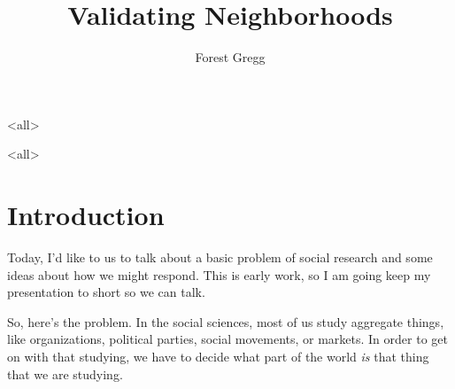 
\usepackage[english]{babel}
\usepackage{tikz}
\usepackage{xmpmulti}
\newcommand{\fadeitem}[2]{\item[]\uncover<#1>{#2}}
\title{Validating Neighborhoods}
\author{Forest Gregg}

\mode*

\mode<all>{
}

\mode<all>{
\blackout{}
}  


\section{Introduction}
Today, I'd like to us to talk about a basic problem of social
research and some ideas about how we might respond. This is early
work, so I am going keep my presentation to short so we can talk.

So, here's the problem. In the social sciences, most of us study
aggregate things, like organizations, political parties, social
movements, or markets. In order to get on with that studying, we have
to decide what part of the world \emph{is} that thing that we are
studying.

